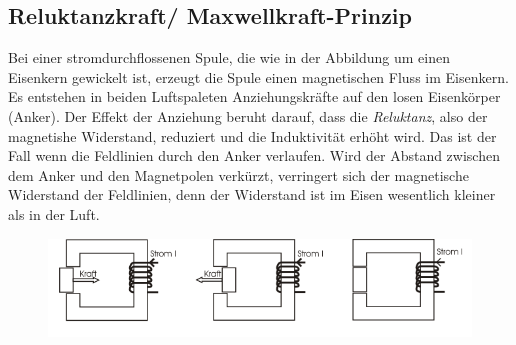 		\subsection{Reluktanzkraft/ Maxwellkraft-Prinzip} \label{reluktanzkraft}
			Bei einer stromdurchflossenen Spule, die wie in der Abbildung um einen Eisenkern gewickelt ist, erzeugt die Spule einen magnetischen Fluss im Eisenkern. Es entstehen in beiden Luftspaleten Anziehungskräfte auf den losen Eisenkörper (Anker). Der Effekt der Anziehung beruht darauf, dass die \textit{Reluktanz}, also der magnetishe Widerstand, reduziert und die Induktivität erhöht wird. Das ist der Fall wenn die Feldlinien durch den Anker verlaufen. Wird der Abstand zwischen dem Anker und den Magnetpolen verkürzt, verringert sich der magnetische Widerstand der Feldlinien, denn der Widerstand ist im Eisen wesentlich kleiner als in der Luft.
			\begin{figure}[h]
				\centering
				\includegraphics[width=0.7\linewidth]{./pics/el/reluktanz}
			\end{figure}
	
